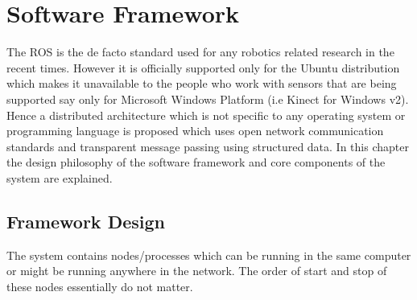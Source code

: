 
\chapter{Software Framework} %

\label{Chapter4} %

The ROS \cite{quigley2009ros} is the de facto standard used for any robotics related research in the recent times. However it is officially supported only for the Ubuntu distribution which makes it unavailable to the people who work with sensors that are being supported say only for Microsoft Windows Platform (i.e Kinect for Windows v2). Hence a distributed architecture which is not specific to any operating system or programming language is proposed which uses open network communication standards and transparent message passing using structured data. In this chapter the design philosophy of the software framework and core components of the system are explained.
		
\section{Framework Design}		
	The system contains nodes/processes which can be running in the same computer or might be running anywhere in the network. The order of start and stop of these nodes essentially do not matter.
